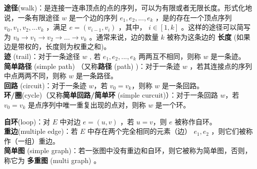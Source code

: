 \documentclass{beamer}
\newcommand{\fdf}[1]{\alert{\textbf{#1}}}
\begin{document}
\begin{frame}
\fdf{途径}(walk)：是连接一连串顶点的点的序列，可以为有限或者无限长度。形式化地说，一条有限途径 $w$ 是一个边的序列 $e_1, e_2, ..., e_k$ ，是的存在一个顶点序列 $v_0, v_1, v_2, ... v_k$ ，满足 $e = (v_{i - 1}, v_i)$ ，其中， $i \in [1, k]$ 。这样的途径可以简写为 $v_0 \rightarrow v_1 \rightarrow v_2 \rightarrow ... \rightarrow v_k$ 。通常来说，边的数量 $k$ 被称为这条边的 \fdf{长度} (如果边是带权的，长度则为权重之和)。 \\
\fdf{迹} (trail)：对于一条途径 $w$ , 若 $e_1, e_2, ..., e_k$ 两两互不相同，则称 $w$ 是一条迹。 \\ 
\fdf{简单路径} (simple path) （又称\fdf{路径} (path) )：对于一条迹 $w$ ，若其连接点的序列中点两两不同，则称	 $w$ 是一条路径。 \\
\fdf{回路} (circuit)：对于一条迹 $w$，若 $v_0 = v_k$，则称 $w$ 是一条回路。 \\ 
\fdf{环/圈}(cycle)（又称\fdf{简单回路/简单环} (simple curcuit)）：对于一条回路 $w$，若 $v_0 = v_k$ 是点序列中唯一重复出现的点对，则称	 $w$ 是一个环。 
\end{frame}
\begin{frame}
\fdf{自环}(loop)：对 $E$ 中对边 $e = (u, v)$ ，若 $u = v$，则 $e$ 被称作自环。\\ 
\fdf{重边}(multiple edge)：若 $E$ 中存在两个完全相同的元素（边） $e_1, e_2$ ，则它们被称作（一组）重边。 \\ 
\fdf{简单图} (simple graph)：若一张图中没有重边和自环，则它被称为简单图，否则，称它为 \fdf{多重图} (multi graph) 。
\end{frame}
\end{document}
